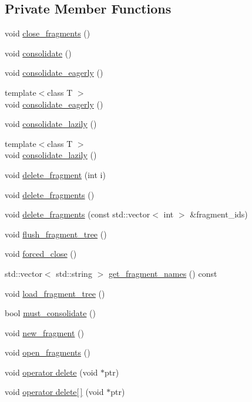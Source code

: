 \subsection*{Private Member Functions}
\begin{DoxyCompactItemize}
\item 
void \hyperlink{classStorageManager_1_1Array_abeb13f5dcb0c733ef7c8d24f10ddfcbf}{close\+\_\+fragments} ()
\item 
void \hyperlink{classStorageManager_1_1Array_a722754b4d8708d7cce91fbdcb17c47df}{consolidate} ()
\item 
void \hyperlink{classStorageManager_1_1Array_a789d77382048b62ea0d56444ade6a940}{consolidate\+\_\+eagerly} ()
\item 
{\footnotesize template$<$class T $>$ }\\void \hyperlink{classStorageManager_1_1Array_aacdf2eb295365f931ded4623aba8df16}{consolidate\+\_\+eagerly} ()
\item 
void \hyperlink{classStorageManager_1_1Array_a3b3f9d1e41940524b3a80aa3c4a9534e}{consolidate\+\_\+lazily} ()
\item 
{\footnotesize template$<$class T $>$ }\\void \hyperlink{classStorageManager_1_1Array_a43c862d4e29d17f1936f555b5b5c9330}{consolidate\+\_\+lazily} ()
\item 
void \hyperlink{classStorageManager_1_1Array_a7f52fcac7db597e490da8ba4e7d18f02}{delete\+\_\+fragment} (int i)
\item 
void \hyperlink{classStorageManager_1_1Array_a87712c167349821559e685451c91027e}{delete\+\_\+fragments} ()
\item 
void \hyperlink{classStorageManager_1_1Array_a70d2a0dd467c286e5775f3349ae71a1f}{delete\+\_\+fragments} (const std\+::vector$<$ int $>$ \&fragment\+\_\+ids)
\item 
void \hyperlink{classStorageManager_1_1Array_a609acd429c23e208754eddddb685d6b3}{flush\+\_\+fragment\+\_\+tree} ()
\item 
void \hyperlink{classStorageManager_1_1Array_a167bc96eb8de2bdf7ce959326a94e79b}{forced\+\_\+close} ()
\item 
std\+::vector$<$ std\+::string $>$ \hyperlink{classStorageManager_1_1Array_a0b5e12e016eb224390e8e12d60851cdc}{get\+\_\+fragment\+\_\+names} () const 
\item 
void \hyperlink{classStorageManager_1_1Array_ab9c50db90b6f8e52c8c5cb719b7ea06e}{load\+\_\+fragment\+\_\+tree} ()
\item 
bool \hyperlink{classStorageManager_1_1Array_a04da148726d39fd950966075e28bc4fe}{must\+\_\+consolidate} ()
\item 
void \hyperlink{classStorageManager_1_1Array_a5cf4f6ad6b053bfe7d14269fef98a7fa}{new\+\_\+fragment} ()
\item 
void \hyperlink{classStorageManager_1_1Array_a73ada9603f1d3fb6ed6b1743c7d099c0}{open\+\_\+fragments} ()
\item 
void \hyperlink{classStorageManager_1_1Array_a16f5faa746ff3d2d109646d4fbbfdf5d}{operator delete} (void $\ast$ptr)
\item 
void \hyperlink{classStorageManager_1_1Array_ac371e07b0420ef1e030d17fe62fae57b}{operator delete\mbox{[}$\,$\mbox{]}} (void $\ast$ptr)
\end{DoxyCompactItemize}
